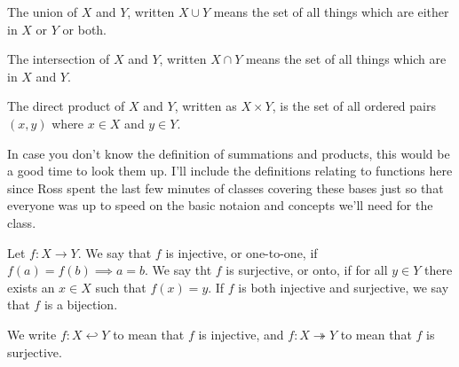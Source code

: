 \begin{definition}[Union]
The union of $X$ and $Y$, written $X \cup Y$ means the set of all things which are either in $X$ or $Y$ or both.
\end{definition}

\begin{definition}[Intersection]
The intersection of $X$ and $Y$, written $X \cap Y$ means the set of all things which are in $X$ and $Y$.
\end{definition}

\begin{definition}
The direct product of $X$ and $Y$, written as $X \times Y$, is the set of all ordered pairs $(x,y)$ where $x \in X$ and $y \in Y$.
\end{definition}

In case you don't know the definition of summations and products, this would be a good time to look them up. I'll include the definitions relating to functions here since Ross spent the last few minutes of classes covering these bases just so that everyone was up to speed on the basic notaion and concepts we'll need for the class.

\begin{definition}
Let $f : X \to Y$. We say that $f$ is injective, or one-to-one, if $f(a) = f(b) \implies a = b$. We say tht $f$ is surjective, or onto, if for all $y \in Y$ there exists an $x \in X$ such that $f(x) = y$. If $f$ is both injective and surjective, we say that $f$ is a bijection. 
\end{definition}

\begin{notation}[$\hookleftarrow$, $\twoheadrightarrow$]
We write $f : X \hookleftarrow Y$ to mean that $f$ is injective, and $f : X \twoheadrightarrow Y$ to mean that $f$ is surjective.
\end{notation}